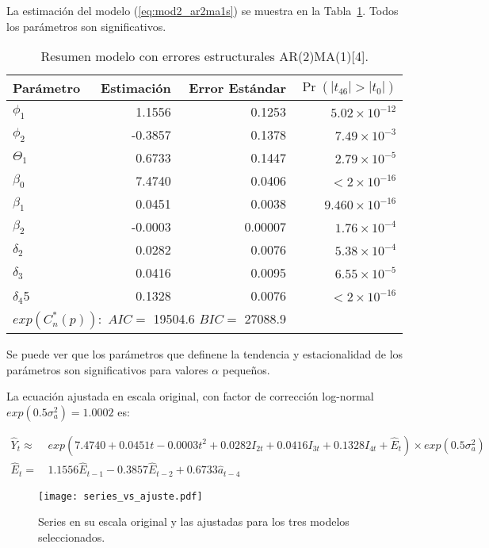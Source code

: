\documentclass[11pt, letterpaper, twoside]{article}
\begin{document}
La estimación del modelo (\ref{eq:mod2_ar2ma1s}) se muestra en la Tabla~\ref{tab:mod2_ar2ma1s}. Todos los parámetros son significativos.

\begin{table}
\caption{Resumen modelo con errores estructurales AR(2)MA(1)[4].}
\label{tab:mod2_ar2ma1s}
\centering
\begin{tabular}{lrrr}
Parámetro & Estimación & Error Estándar & $\Pr(|t_{46}| > |t_0|)$ \\
  \hline
  $\phi_1$ & 1.1556 & 0.1253 & $5.02\times10^{-12}$ \\
    $\phi_2$ & -0.3857 & 0.1378 & $7.49\times10^{-3}$ \\
    $\Theta_1$ & 0.6733 & 0.1447 & $2.79\times10^{-5}$ \\
$\beta_0$ & 7.4740 & 0.0406 & $< 2\times10^{-16}$ \\
 $\beta_1$ & 0.0451 & 0.0038 &  $9.460\times10^{-16}$\\
 $\beta_2$ & -0.0003 & 0.00007 & $1.76\times10^{-4}$ \\
  $\delta_2$  & 0.0282 & 0.0076 & $5.38\times10^{-4}$ \\
  $\delta_3$ & 0.0416 & 0.0095 & $6.55\times10^{-5}$ \\
 $\delta_4$5 & 0.1328 & 0.0076 & $< 2\times10^{-16}$ \\
   \hline
   \multicolumn{3}{l}{$exp(C_n^*(p)):$ $AIC=$ 19504.6 $BIC=$ 27088.9} & \\
    \hline
\end{tabular}
\end{table}

Se puede ver que los parámetros que definene la tendencia y estacionalidad de los parámetros son significativos para valores $\alpha$ pequeños.

La ecuación ajustada en escala original, con factor de corrección log-normal $exp(0.5 \sigma_a^2)=1.0002$ es:

\begin{align}
\label{eq:mod2_ar2ma1s_aju}
    \hat{Y}_t \approx & \, exp(7.4740 + 0.0451 t - 0.0003 t^2 + 0.0282 I_{2t} + 0.0416 I_{3t} + 0.1328 I_{4t} + \hat{E}_t) \times exp(0.5\sigma_a^2) \\
    \hat{E}_t = &\, 1.1556 \hat{E}_{t-1} - 0.3857 \hat{E}_{t-2} + 0.6733 \hat{a}_{t-4} \nonumber
\end{align}

\begin{figure}[ht!]
\centering
\texttt{[image: series\_vs\_ajuste.pdf]}
\caption{Series en su escala original y las ajustadas para los tres modelos seleccionados.}
\label{fig:residuales_ar2ma1s}
\end{figure}
\end{document}
